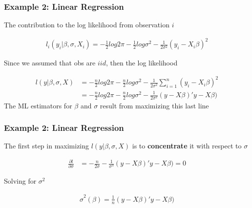 \documentclass[
  shownotes,
  xcolor={svgnames},
  hyperref={colorlinks,citecolor=DarkBlue,linkcolor=DarkRed,urlcolor=DarkBlue}
  ]{beamer}
\begin{document}
\begin{frame}[fragile]
\frametitle{Example 2: Linear Regression}
The contribution to the log likelihood from observation $i$

\begin{align}
l_i(y_i|\beta,\sigma,X_i)=-\frac{1}{2}log 2 \pi-\frac{1}{2}log\sigma^2-\frac{1}{2\sigma^2}(y_i-X_i\beta)^2
\end{align}

Since we assumed that obs are $iid$, then the log likelihood

\begin{align}
l(y|\beta,\sigma,X) &=-\frac{n}{2}log 2 \pi-\frac{n}{2}log\sigma^2-\frac{1}{2\sigma^2}\sum_{i=1}^n(y_i-X_i\beta)^2  \\
&=-\frac{n}{2}log 2 \pi-\frac{n}{2}log\sigma^2-\frac{1}{2\sigma^2}(y-X\beta)'y-X\beta)
\end{align}
The ML estimators for $\beta$ and $\sigma$ result from maximizing this last line
\end{frame}


\begin{frame}[fragile]
\frametitle{Example 2: Linear Regression}


The first step in maximizing $l(y|\beta,\sigma,X)$ is to {\bf concentrate} it with respect to $\sigma$

\begin{align}
\frac{\partial l}{\partial \sigma}&=-\frac{n}{2\sigma}-\frac{1}{\sigma^3}(y-X\beta)'y-X\beta)=0
\end{align}

Solving for $\sigma^2$

\begin{align}
\hat \sigma^2(\beta) = \frac{1}{n}(y-X\beta)'y-X\beta)
\end{align}

\end{frame}
\end{document}
